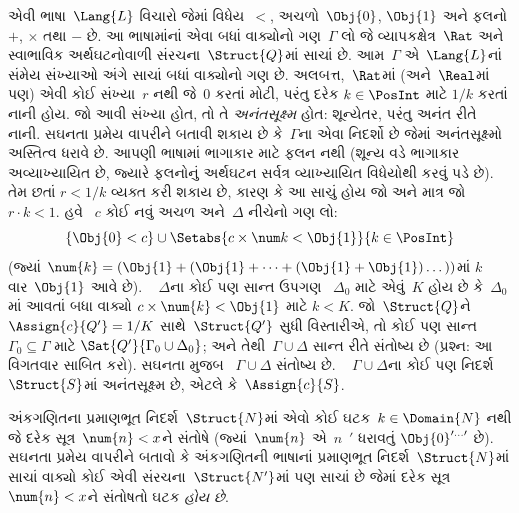 
\begin{ex}
એવી ભાષા~$\Lang{L}$ વિચારો જેમાં વિધેય~$<$,
અચળો~$\Obj{0}$, $\Obj{1}$ અને ફલનો $+$, $\times$ તથા
$-$ છે. આ ભાષામાંનાં એવા બધાં વાક્યોનો ગણ~$\Gamma$ લો
જે વ્યાપકક્ષેત્ર~$\Rat$ અને સ્વાભાવિક અર્થઘટનોવાળી
સંરચના~$\Struct{Q}$માં સાચાં છે. આમ~$\Gamma$ એ~$\Lang{L}$નાં
સંમેય સંખ્યાઓ અંગે સાચાં બધાં વાક્યોનો ગણ છે. અલબત્ત,~$\Rat$માં
(અને~$\Real$માં પણ) એવી કોઈ સંખ્યા~$r$ નથી જે~$0$ કરતાં મોટી, પરંતુ
દરેક $k\in\PosInt$ માટે $1/k$ કરતાં નાની હોય. જો આવી સંખ્યા હોત, તો તે
\emph{અનંતસૂક્ષ્મ} હોત: શૂન્યેતર, પરંતુ અનંત રીતે નાની. સઘનતા પ્રમેય
વાપરીને બતાવી શકાય છે કે~$\Gamma$ના એવા નિદર્શો છે જેમાં અનંતસૂક્ષ્મો
અસ્તિત્વ ધરાવે છે. આપણી ભાષામાં ભાગાકાર માટે ફલન નથી
(શૂન્ય વડે ભાગાકાર અવ્યાખ્યાયિત છે, જ્યારે ફલનોનું અર્થઘટન
સર્વત્ર વ્યાખ્યાયિત વિધેયોથી કરવું પડે છે). તેમ છતાં $r<1/k$ વ્યક્ત
કરી શકાય છે, કારણ કે આ સાચું હોય જો અને માત્ર જો $r\cdot k<1$. હવે
~$c$ કોઈ નવું અચળ અને~$\Delta$ નીચેનો ગણ લો:
\[
\{\Obj{0}<c\}
\cup \Setabs{c\times\num k<\Obj{1}}{k\in\PosInt}
\]
(જ્યાં $\num{k}=(\Obj{1}+(\Obj{1}+\dots+(\Obj{1}+\Obj{1})\dots))$માં
$k$ વાર~$\Obj{1}$ આવે છે). ~ $\Delta$ના કોઈ પણ સાન્ત ઉપગણ
~$\Delta_0$ માટે એવું~$K$ હોય છે કે~$\Delta_0$માં આવતાં બધા
વાક્યો $c\times\num{k}<\Obj{1}$ માટે $k<K$. જો~$\Struct{Q}$ને
$\Assign{c}{Q'}=1/K$ સાથે~$\Struct{Q'}$ સુધી વિસ્તારીએ, તો કોઈ પણ
સાન્ત $\Gamma_0\subseteq\Gamma$ માટે
$\Sat{Q'}{\Gamma_0\cup\Delta_0}$; અને તેથી~$\Gamma\cup\Delta$ સાન્ત
રીતે સંતોષ્ય છે (પ્રશ્ન: આ વિગતવાર સાબિત કરો). સઘનતા મુજબ
~$\Gamma\cup\Delta$ સંતોષ્ય છે. ~ $\Gamma\cup\Delta$ના કોઈ પણ નિદર્શ
~$\Struct{S}$માં અનંતસૂક્ષ્મ છે, એટલે કે~$\Assign{c}{S}$.
\end{ex}




\begin{prob}
અંકગણિતના પ્રમાણભૂત નિદર્શ~$\Struct{N}$માં એવો કોઈ
ઘટક~$k\in\Domain{N}$ નથી જે દરેક સૂત્ર~$\num{n}<x$ને સંતોષે
(જ્યાં~$\num{n}$ એ~$n$~$\prime$ ધરાવતું
$\Obj{0}^{\prime\dots\prime}$ છે). સઘનતા પ્રમેય વાપરીને બતાવો કે
અંકગણિતની ભાષાનાં પ્રમાણભૂત નિદર્શ~$\Struct{N}$માં સાચાં વાક્યો કોઈ
એવી સંરચના~$\Struct{N'}$માં પણ સાચાં છે જેમાં દરેક સૂત્ર
$\num{n}<x$ને સંતોષતો ઘટક \emph{હોય છે}.
\end{prob}


